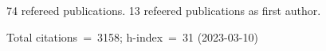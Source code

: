 74 refereed publications. 13 refeered publications as first author.

Total citations~=~3158; h-index~=~31 (2023-03-10)